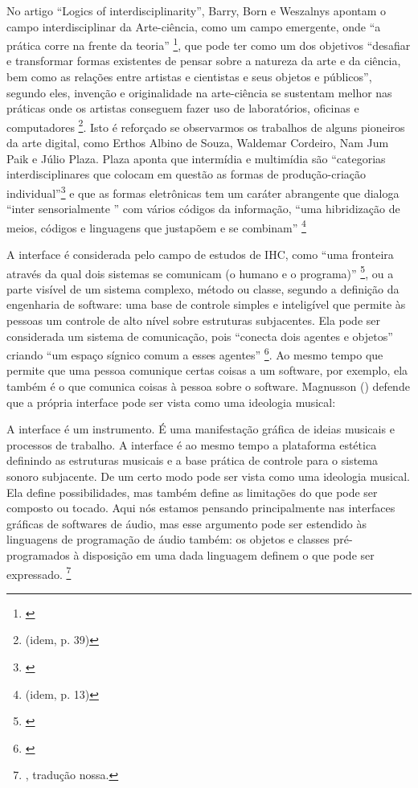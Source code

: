 No artigo ``Logics of interdisciplinarity'', Barry, Born e Weszalnys apontam o campo interdisciplinar da Arte-ciência, como um campo emergente, onde ``a prática corre na frente da teoria'' \footnote{\cite{Barry2008}}, que pode ter como um dos objetivos ``desafiar e transformar formas existentes de pensar sobre a natureza da arte e da ciência, bem como as relações entre artistas e cientistas e seus objetos e públicos'', segundo eles, invenção e originalidade na arte-ciência se sustentam melhor nas práticas onde os artistas conseguem fazer uso de laboratórios, oficinas e computadores \footnote{(idem, p. 39)}. Isto é reforçado se observarmos os trabalhos de alguns pioneiros da arte digital, como Erthos Albino de Souza, Waldemar Cordeiro, Nam Jum Paik e Júlio Plaza. Plaza aponta que intermídia e multimídia são ``categorias interdisciplinares  que colocam em questão as formas de produção-criação individual''\footnote{\cite[p. 66]{JulioPlaza1969}} e que as formas eletrônicas tem um caráter abrangente que dialoga ``inter sensorialmente '' com vários códigos da informação, ``uma hibridização de meios, códigos e linguagens que justapõem e se combinam'' \footnote{(idem, p. 13)}

A interface é considerada pelo campo de estudos de IHC, como “uma fronteira através da qual dois sistemas se comunicam (o humano e o programa)” \footnote{\cite{Magnusson2005}}, ou a parte visível de um sistema complexo, método ou classe, segundo a definição da engenharia de software: uma base de controle simples e inteligível que permite às pessoas um controle de alto nível sobre estruturas subjacentes. Ela pode ser considerada um sistema de comunicação, pois “conecta dois agentes e objetos” criando “um espaço sígnico comum a esses agentes” \footnote{\cite[p. 105]{IAZZETTA1997}}. Ao mesmo tempo que permite que uma pessoa comunique certas coisas a um software, por exemplo, ela também é o que comunica coisas à pessoa sobre o software. Magnusson (\citeyear{Magnusson2005}) defende que a própria interface pode ser vista como uma ideologia musical: 

\begin{citacao}
A interface é um instrumento. É uma manifestação gráfica de ideias musicais e processos de trabalho. A interface é ao mesmo tempo a plataforma estética definindo as estruturas musicais e a base prática de controle para o sistema sonoro subjacente. De um certo modo pode ser vista como uma ideologia musical. Ela define possibilidades, mas também define as limitações do que pode ser composto ou tocado. Aqui nós estamos pensando principalmente nas interfaces gráficas de softwares de áudio, mas esse argumento pode ser estendido às linguagens de programação de áudio também: os objetos e classes pré-programados à disposição em uma dada linguagem definem o que pode ser expressado. \footnote{\cite[p. 212]{Magnusson2005}, tradução nossa.}
\end{citacao}


